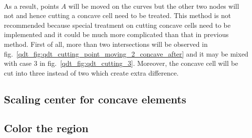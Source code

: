 \paragraph{}
As a result, points $A$ will be moved on the curves but the other two nodes will not and hence cutting a concave cell need to be treated.
This method is not recommended because special treatment on cutting concave cells need to be implemented and it could be much more complicated than that in previous method.
First of all, more than two intersections will be observed in fig.~\ref{qdt_fig:qdt_cutting_point_moving_2_concave_after} and it may be mixed with case 3 in fig.~\ref{qdt_fig:qdt_cutting_3}.
Moreover, the concave cell will be cut into three instead of two which create extra difference.

\pagebreak
\subsection{Scaling center for concave elements}



\pagebreak
\subsection{Color the region}



\pagebreak